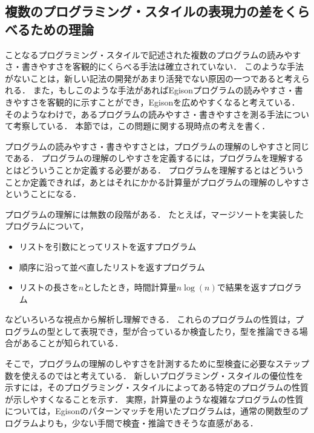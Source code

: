 \subsection{複数のプログラミング・スタイルの表現力の差をくらべるための理論}

ことなるプログラミング・スタイルで記述された複数のプログラムの読みやすさ・書きやすさを客観的にくらべる手法は確立されていない．
このような手法がないことは，新しい記法の開発があまり活発でない原因の一つであると考えられる．
また，もしこのような手法があればEgisonプログラムの読みやすさ・書きやすさを客観的に示すことができ，Egisonを広めやすくなると考えている．
そのようなわけで，あるプログラムの読みやすさ・書きやすさを測る手法について考察している．
本節では，この問題に関する現時点の考えを書く．

プログラムの読みやすさ・書きやすさとは，プログラムの理解のしやすさと同じである．
プログラムの理解のしやすさを定義するには，プログラムを理解するとはどういうことか定義する必要がある．
プログラムを理解するとはどういうことか定義できれば，あとはそれにかかる計算量がプログラムの理解のしやすさということになる．

プログラムの理解には無数の段階がある．
たとえば，マージソートを実装したプログラムについて，
\begin{itemize}
\item リストを引数にとってリストを返すプログラム
\item 順序に沿って並べ直したリストを返すプログラム
\item リストの長さを$n$としたとき，時間計算量$n \log(n)$で結果を返すプログラム
\end{itemize}
などいろいろな視点から解析し理解できる．
これらのプログラムの性質は，プログラムの型として表現でき，型が合っているか検査したり，型を推論できる場合があることが知られている．

そこで，プログラムの理解のしやすさを計測するために型検査に必要なステップ数を使えるのではと考えている．
新しいプログラミング・スタイルの優位性を示すには，そのプログラミング・スタイルによってある特定のプログラムの性質が示しやすくなることを示す．
実際，計算量のような複雑なプログラムの性質については，Egisonのパターンマッチを用いたプログラムは，通常の関数型のプログラムよりも，少ない手間で検査・推論できそうな直感がある．

%
%
